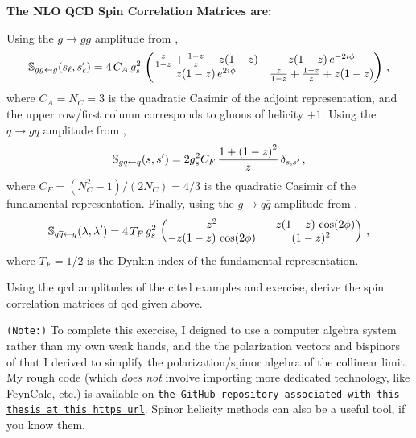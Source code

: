 \begin{answer}
       \begin{center}
        {\normalfont\Large\bfseries\sffamily The NLO QCD Spin Correlation Matrices are:}
    \end{center}


    Using the \(g \to g g\) amplitude from ,
    \begin{align}
        \label{eq:s_g_to_gg}
        \mathbb{S}_{g g \leftarrow g}(s_\ell, s_\ell')
        =
        4 \, C_A \, g_s^2
        \,
        \pmtrx{
            \frac{z}{1-z}+\frac{1-z}{z}+z(1-z)
            &
            z(1-z)\,e^{-2 i \phi}
            \\
            z(1-z)\,e^{2 i \phi}
            &
            \frac{z}{1-z}+\frac{1-z}{z}+z(1-z)
        }
        \,,
    \end{align}
    where \(C_A=N_C=3\) is the quadratic Casimir of the adjoint representation, and the upper row/first column corresponds to gluons of helicity \(+1\).
    Using the \(q \to g q\) amplitude from ,
    \begin{align}
        \label{eq:s_q_to_qg}
        \mathbb{S}_{g q \leftarrow q}(s, s')
        =
        2 g_s^2 C_F
        \,
        \frac{1 + \le(1-z\ri)^2}{z}
        \,
        \delta_{s, s'}
        \,,
    \end{align}
    where \(C_F = (N_C^2 - 1)/(2 N_C) = 4/3\) is the quadratic Casimir of the fundamental representation.
    Finally, using the \(g \to q \overline{q}\) amplitude from ,
    \begin{align}
        \label{eq:s_g_to_qq}
        \mathbb{S}_{q \overline{q} \leftarrow g}(\lambda, \lambda')
        =
        4 \, T_F \, g_s^2
        \,
        \pmtrx{
            z^2
            &
            -z(1-z)\, \cos(2\phi)
            \\
            -z(1-z)\,\cos(2\phi)
            &
            (1-z)^2
        }
        \,,
    \end{align}
    where \(T_F = 1/2\) is the Dynkin index of the fundamental representation.
\end{answer}

\begin{exercise}
    \label{ex:spin-correlation-exercise}
    Using the \gls{qcd} amplitudes of the cited examples and exercise, derive the spin correlation matrices of \gls{qcd} given above.

    \texttt{(Note:)}
    To complete this exercise, I deigned to use a computer algebra system rather than my own weak hands, and the the polarization vectors and bispinors of  that I derived to simplify the polarization/spinor algebra of the collinear limit.
    My rough code (which \textit{does not} involve importing more dedicated technology, like FeynCalc, etc.) is available on \href{https://github.com/samcaf/Thesis}{\texttt{the GitHub repository associated with this thesis at this https url}}.
    Spinor helicity methods can also be a useful tool, if you know them.
\end{exercise}



